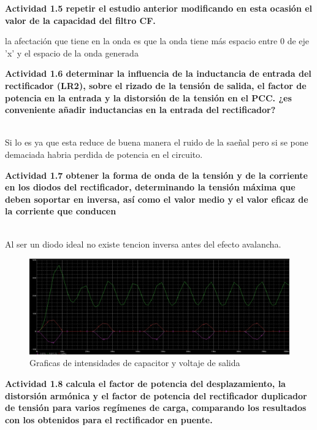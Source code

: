 ﻿\documentclass[letterpaper]{article}
\begin{document}
 \begin{large}

\textbf{Actividad 1.5 repetir el estudio anterior modificando en esta ocasión
el valor de la capacidad del filtro CF.} \end{large}
la afectación que tiene en la onda es que la onda tiene más espacio entre 0 de eje 'x' y el espacio de la onda generada 
 \begin{large}

\textbf{Actividad 1.6 determinar la influencia de la inductancia de entrada
del rectificador (LR2), sobre el rizado de la tensión de salida, el
factor de potencia en la entrada y la distorsión de la tensión en
el PCC. ¿es conveniente añadir inductancias en la entrada del rectificador? }\end{large}
 \begin{large}\\
 Si lo es ya que esta reduce de buena manera el ruido de la saeñal pero si se pone demaciada habria perdida de potencia en el circuito.

\textbf{Actividad 1.7 obtener la forma de onda de la tensión y de la corriente
en los diodos del rectificador, determinando la tensión máxima que
deben soportar en inversa, así como el valor medio y el valor eficaz
de la corriente que conducen} \end{large}\\
Al ser un diodo ideal no existe tencion inversa antes del efecto avalancha.
\begin{figure}[htb]
    \centering
    \includegraphics[scale=0.3]{ondadio.png}
    \caption{Graficas de intensidades de capacitor y voltaje de salida}
    \label{fig:cb15}
\end{figure}
 \begin{large}

\textbf{Actividad 1.8 calcula el factor de potencia del desplazamiento, la
distorsión armónica y el factor de potencia del rectificador duplicador
de tensión para varios regímenes de carga, comparando los resultados
con los obtenidos para el rectificador en puente.}\end{large}
\end{document}

